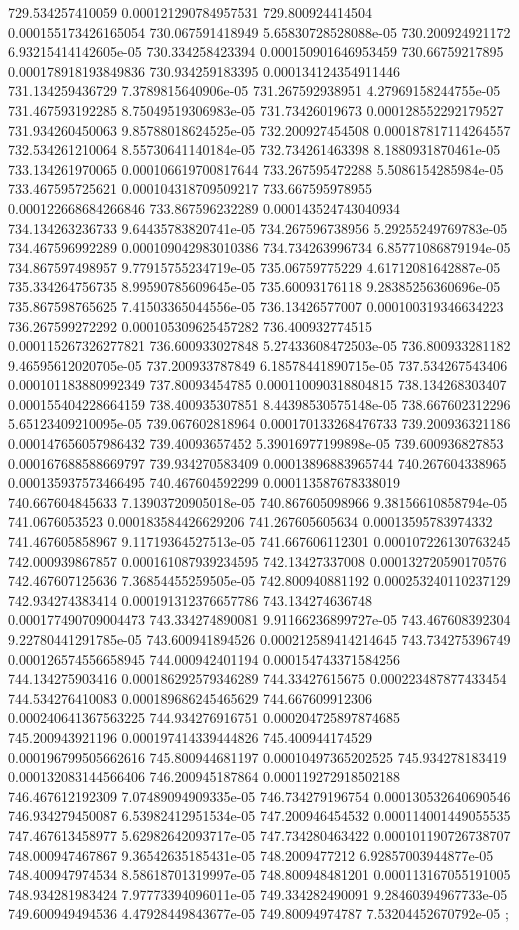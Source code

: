 {729.534257410059 0.000121290784957531
729.800924414504 0.000155173426165054
730.067591418949 5.65830728528088e-05
730.200924921172 6.93215414142605e-05
730.334258423394 0.000150901646953459
730.66759217895 0.000178918193849836
730.934259183395 0.000134124354911446
731.134259436729 7.3789815640906e-05
731.267592938951 4.27969158244755e-05
731.467593192285 8.75049519306983e-05
731.73426019673 0.000128552292179527
731.934260450063 9.85788018624525e-05
732.200927454508 0.000187817114264557
732.534261210064 8.55730641140184e-05
732.734261463398 8.1880931870461e-05
733.134261970065 0.000106619700817644
733.267595472288 5.5086154285984e-05
733.467595725621 0.000104318709509217
733.667595978955 0.000122668684266846
733.867596232289 0.000143524743040934
734.134263236733 9.64435783820741e-05
734.267596738956 5.29255249769783e-05
734.467596992289 0.000109042983010386
734.734263996734 6.85771086879194e-05
734.867597498957 9.77915755234719e-05
735.06759775229 4.61712081642887e-05
735.334264756735 8.99590785609645e-05
735.60093176118 9.28385256360696e-05
735.867598765625 7.41503365044556e-05
736.13426577007 0.000100319346634223
736.267599272292 0.000105309625457282
736.400932774515 0.000115267326277821
736.600933027848 5.27433608472503e-05
736.800933281182 9.46595612020705e-05
737.200933787849 6.18578441890715e-05
737.534267543406 0.000101183880992349
737.80093454785 0.000110090318804815
738.134268303407 0.000155404228664159
738.400935307851 8.44398530575148e-05
738.667602312296 5.65123409210095e-05
739.067602818964 0.000170133268476733
739.200936321186 0.000147656057986432
739.40093657452 5.39016977199898e-05
739.600936827853 0.000167688588669797
739.934270583409 0.00013896883965744
740.267604338965 0.000135937573466495
740.467604592299 0.000113587678338019
740.667604845633 7.13903720905018e-05
740.867605098966 9.38156610858794e-05
741.0676053523 0.000183584426629206
741.267605605634 0.00013595783974332
741.467605858967 9.11719364527513e-05
741.667606112301 0.000107226130763245
742.000939867857 0.000161087939234595
742.13427337008 0.000132720590170576
742.467607125636 7.36854455259505e-05
742.800940881192 0.000253240110237129
742.934274383414 0.000191312376657786
743.134274636748 0.000177490709004473
743.334274890081 9.91166236899727e-05
743.467608392304 9.22780441291785e-05
743.600941894526 0.000212589414214645
743.734275396749 0.000126574556658945
744.000942401194 0.000154743371584256
744.134275903416 0.000186292579346289
744.33427615675 0.000223487877433454
744.534276410083 0.000189686245465629
744.667609912306 0.000240641367563225
744.934276916751 0.000204725897874685
745.200943921196 0.000197414339444826
745.400944174529 0.000196799505662616
745.800944681197 0.00010497365202525
745.934278183419 0.000132083144566406
746.200945187864 0.000119272918502188
746.467612192309 7.07489094909335e-05
746.734279196754 0.000130532640690546
746.934279450087 6.53982412951534e-05
747.200946454532 0.000114001449055535
747.467613458977 5.62982642093717e-05
747.734280463422 0.000101190726738707
748.000947467867 9.36542635185431e-05
748.2009477212 6.92857003944877e-05
748.400947974534 8.58618701319997e-05
748.800948481201 0.000113167055191005
748.934281983424 7.97773394096011e-05
749.334282490091 9.28460394967733e-05
749.600949494536 4.47928449843677e-05
749.80094974787 7.53204452670792e-05
};